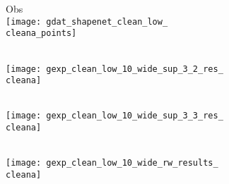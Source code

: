 \newcommand{\cleana}{231} %
\newcommand{\cleanb}{297}

\newcommand{\noisya}{132}
\newcommand{\noisyb}{66}

\newcommand{\bathtuba}{792}
\newcommand{\bathtubb}{330}

\newcommand{\chaira}{528}
\newcommand{\chairb}{990} %

\newcommand{\deska}{264} %
\newcommand{\deskb}{858}

\newcommand{\tablea}{858}
\newcommand{\tableb}{396} %
\begin{figure*}[t]
    \vspace*{-\figskipabove px}
    \vspace*{2px}
    \centering
    {\scriptsize
    \begin{subfigure}[t]{1\textwidth}
        \begin{subfigure}[t]{0.095\textwidth}
        	\vspace{0px}\centering
        	Obs\\
        	\texttt{[image: gdat\_shapenet\_clean\_low\_\\cleana\_points]}
        \end{subfigure}
        \begin{subfigure}[t]{0.095\textwidth}
        	\vspace{0px}\centering
        	\Dai\\
        	\texttt{[image: gexp\_clean\_low\_10\_wide\_sup\_3\_2\_res\_\\cleana]}
        \end{subfigure}
        \begin{subfigure}[t]{0.095\textwidth}
            \vspace{0px}\centering
            \Dai\\
            \texttt{[image: gexp\_clean\_low\_10\_wide\_sup\_3\_3\_res\_\\cleana]}
        \end{subfigure}
        \begin{subfigure}[t]{0.095\textwidth}
            \vspace{0px}\centering
            \Engelmann\\
            \texttt{[image: gexp\_clean\_low\_10\_wide\_rw\_results\_\\cleana]}
        \end{subfigure}
        \begin{subfigure}[t]{0.095\textwidth}

\end{subfigure}
\end{subfigure}}
\end{figure*}
